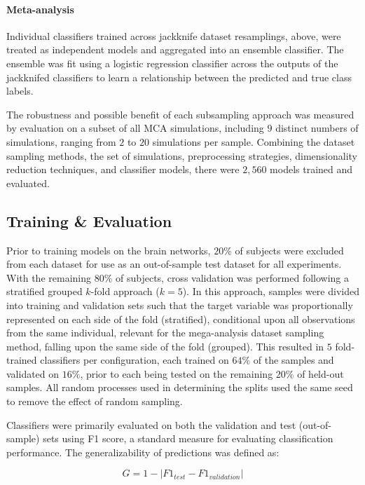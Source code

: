 \documentclass[10pt]{SelfArx} %
\begin{document}
\paragraph{Meta-analysis} Individual classifiers trained across jackknife dataset resamplings, above, were treated as
independent models and aggregated into an ensemble classifier. The ensemble was fit using a logistic regression
classifier across the outputs of the jackknifed classifiers to learn a relationship between the predicted and true
class labels.

The robustness and possible benefit of each subsampling approach was measured by evaluation on a subset of all MCA
simulations, including $9$ distinct numbers of simulations, ranging from $2$ to $20$ simulations per sample. Combining
the dataset sampling methods, the set of simulations, preprocessing strategies, dimensionality reduction techniques,
and classifier models, there were $2,560$ models trained and evaluated.

\subsection*{Training \& Evaluation}

Prior to training models on the brain networks, $20\%$ of subjects were excluded from each dataset for use as an
out-of-sample test dataset for all experiments. With the remaining $80\%$ of subjects, cross validation was performed
following a stratified grouped $k$-fold approach ($k=5$). In this approach, samples were divided into training and
validation sets such that the target variable was proportionally represented on each side of the fold (stratified),
conditional upon all observations from the same individual, relevant for the mega-analysis dataset sampling method,
falling upon the same side of the fold (grouped). This resulted in $5$ fold-trained classifiers per configuration, each
trained on $64\%$ of the samples and validated on $16\%$, prior to each being tested on the remaining $20\%$ of
held-out samples. All random processes used in determining the splits used the same seed to remove the effect of random
sampling.

Classifiers were primarily evaluated on both the validation and test (out-of-sample) sets using F1 score, a standard
measure for evaluating classification performance. The generalizability of predictions was defined as:

\begin{equation}
G = 1 - \lvert F1_{test} - F1_{validation} \rvert
\label{eq:gen}
\end{equation}
\end{document}
